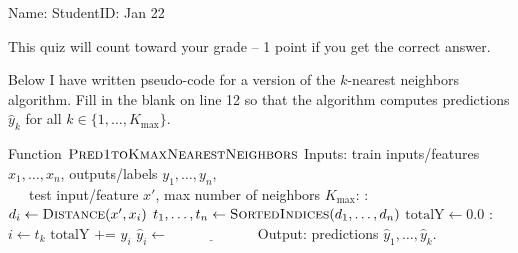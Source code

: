 \documentclass{article}[12pt]
\begin{document}
\thispagestyle{empty}


Name: \underline{\hspace{2in}} StudentID: \underline{\hspace{2in}} Jan 22

This quiz will count toward your grade -- 1 point if you get the
correct answer.

Below I have written pseudo-code for a version of the $k$-nearest
neighbors algorithm. Fill in the blank on line 12 so that the
algorithm computes predictions $\hat y_k$ for all
$k\in\{1,\dots, K_{\text{max}}\}$.

\begin{algorithmic}[1]
  \State Function $\textsc{Pred1toKmaxNearestNeighbors}$
  \State Inputs: train inputs/features $x_1,\dots,x_n$, outputs/labels $y_1,\dots,y_n$,\\ \ \ \ test input/feature $x'$, max number of neighbors $K_{\text{max}}$:
  :
  \State $d_i\gets \textsc{Distance}(x', x_i)$
  \EndFor
  \State $t_1,\dots,t_n\gets \textsc{SortedIndices}(d_1,\dots,d_n)$
  \State $\text{totalY}\gets 0.0$
  :
  \State $i\gets t_k$
  \State $\text{totalY} \texttt{ += } y_i$
  \State $\hat y_i\gets \underline{\hspace{1in}}$
  \EndFor
  \State Output: predictions $\hat y_1, \dots, \hat y_k$.
\end{algorithmic}
\end{document}
